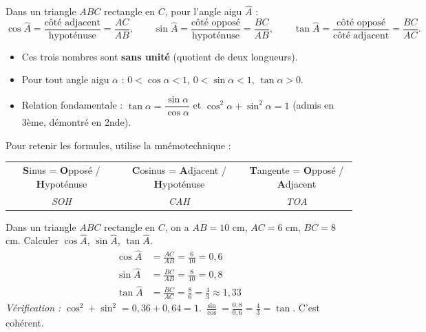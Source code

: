 \documentclass[11pt]{article}
\begin{document}
\begin{propriete}
Dans un triangle $ABC$ rectangle en $C$, pour l'angle aigu $\widehat{A}$ :
\[
\cos \widehat{A} = \dfrac{\text{côté adjacent}}{\text{hypoténuse}} = \dfrac{AC}{AB}, \qquad
\sin \widehat{A} = \dfrac{\text{côté opposé}}{\text{hypoténuse}} = \dfrac{BC}{AB}, \qquad
\tan \widehat{A} = \dfrac{\text{côté opposé}}{\text{côté adjacent}} = \dfrac{BC}{AC}.
\]
\begin{itemize}
\item Ces trois nombres sont \textbf{sans unité} (quotient de deux longueurs).
\item Pour tout angle aigu $\alpha$ : $0 < \cos \alpha < 1$, $0 < \sin \alpha < 1$, $\tan \alpha > 0$.
\item Relation fondamentale : $\tan \alpha = \dfrac{\sin \alpha}{\cos \alpha}$ et $\cos^2\alpha + \sin^2\alpha = 1$ (admis en 3ème, démontré en 2nde).
\end{itemize}
\end{propriete}

\begin{aretenir}
Pour retenir les formules, utilise la mnémotechnique :
\begin{center}
\begin{tabular}{c c c}
\textbf{S}inus = \textbf{O}pposé / \textbf{H}ypoténuse & \textbf{C}osinus = \textbf{A}djacent / \textbf{H}ypoténuse & \textbf{T}angente = \textbf{O}pposé / \textbf{A}djacent \\
\emph{SOH} & \emph{CAH} & \emph{TOA}
\end{tabular}
\end{center}
\end{aretenir}

\begin{exemplebox}
Dans un triangle $ABC$ rectangle en $C$, on a $AB = 10$ cm, $AC = 6$ cm, $BC = 8$ cm. Calculer $\cos \widehat{A}$, $\sin \widehat{A}$, $\tan \widehat{A}$.
\begin{align*}
\cos \widehat{A} &= \frac{AC}{AB} = \frac{6}{10} = 0{,}6 \\
\sin \widehat{A} &= \frac{BC}{AB} = \frac{8}{10} = 0{,}8 \\
\tan \widehat{A} &= \frac{BC}{AC} = \frac{8}{6} = \frac{4}{3} \approx 1{,}33
\end{align*}
\emph{Vérification :} $\cos^2 + \sin^2 = 0,36 + 0,64 = 1$. $\frac{\sin}{\cos} = \frac{0,8}{0,6} = \frac{4}{3} = \tan$. C'est cohérent.
\end{exemplebox}
\end{document}
